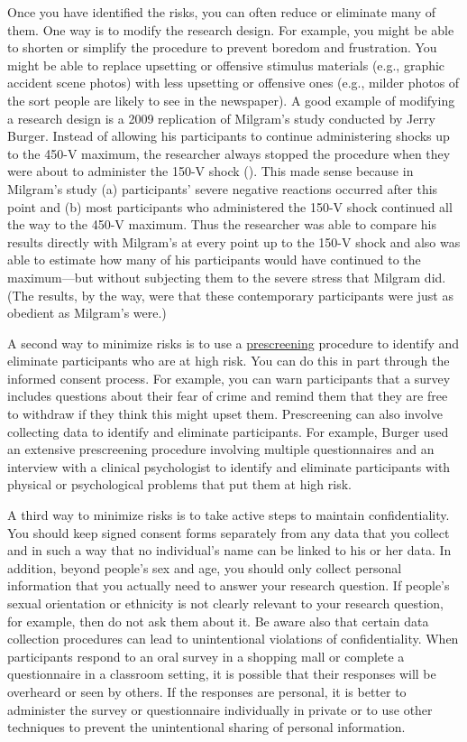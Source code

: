\documentclass[
]{krantz}
\begin{document}
Once you have identified the risks, you can often reduce or eliminate many of them. One way is to modify the research design. For example, you might be able to shorten or simplify the procedure to prevent boredom and frustration. You might be able to replace upsetting or offensive stimulus materials (e.g., graphic accident scene photos) with less upsetting or offensive ones (e.g., milder photos of the sort people are likely to see in the newspaper). A good example of modifying a research design is a 2009 replication of Milgram's study conducted by Jerry Burger. Instead of allowing his participants to continue administering shocks up to the 450-V maximum, the researcher always stopped the procedure when they were about to administer the 150-V shock (). This made sense because in Milgram's study (a) participants' severe negative reactions occurred after this point and (b) most participants who administered the 150-V shock continued all the way to the 450-V maximum. Thus the researcher was able to compare his results directly with Milgram's at every point up to the 150-V shock and also was able to estimate how many of his participants would have continued to the maximum---but without subjecting them to the severe stress that Milgram did. (The results, by the way, were that these contemporary participants were just as obedient as Milgram's were.)

A second way to minimize risks is to use a \hyperref[prescreening]{prescreening} procedure to identify and eliminate participants who are at high risk. You can do this in part through the informed consent process. For example, you can warn participants that a survey includes questions about their fear of crime and remind them that they are free to withdraw if they think this might upset them. Prescreening can also involve collecting data to identify and eliminate participants. For example, Burger used an extensive prescreening procedure involving multiple questionnaires and an interview with a clinical psychologist to identify and eliminate participants with physical or psychological problems that put them at high risk.

A third way to minimize risks is to take active steps to maintain confidentiality. You should keep signed consent forms separately from any data that you collect and in such a way that no individual's name can be linked to his or her data. In addition, beyond people's sex and age, you should only collect personal information that you actually need to answer your research question. If people's sexual orientation or ethnicity is not clearly relevant to your research question, for example, then do not ask them about it. Be aware also that certain data collection procedures can lead to unintentional violations of confidentiality. When participants respond to an oral survey in a shopping mall or complete a questionnaire in a classroom setting, it is possible that their responses will be overheard or seen by others. If the responses are personal, it is better to administer the survey or questionnaire individually in private or to use other techniques to prevent the unintentional sharing of personal information.
\end{document}
